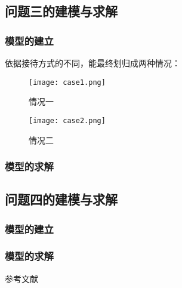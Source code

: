\documentclass[withoutpreface,bwprint]{cumcmthesis} %
\begin{document}
\newpage
\subsection{问题三的建模与求解}

\subsubsection{模型的建立}
依据接待方式的不同，能最终划归成两种情况：
\begin{figure}[!h]
	\centering
	\texttt{[image: case1.png]}
	\caption{情况一}
\end{figure}

\begin{figure}[!h]
	\centering
	\texttt{[image: case2.png]}
	\caption{情况二}
\end{figure}


\subsubsection{模型的求解}



\newpage
\subsection{问题四的建模与求解}
\subsubsection{模型的建立}


\subsubsection{模型的求解}

\newpage
\begin{thebibliography}{9} %
	 参考文献
\end{thebibliography}
\end{document}
